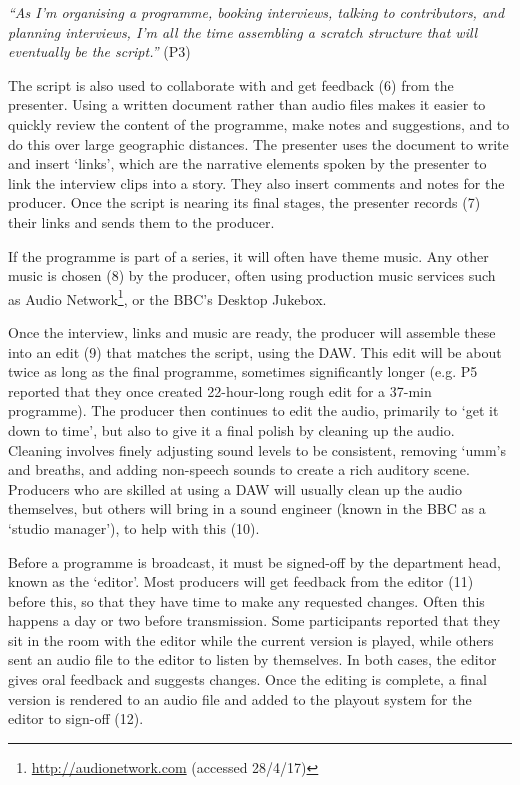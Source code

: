 \textit{``As I'm organising a programme, booking interviews, talking to contributors, and planning interviews, I'm all the time
assembling a scratch structure that will eventually be the script.''} (P3) %

The script is also used to collaborate with and get feedback (6) from the presenter.  Using a written document rather
than audio files makes it easier to quickly review the content of the programme, make notes and suggestions, and to do
this over large geographic distances. The presenter uses the document to write and insert `links', which are the
narrative elements spoken by the presenter to link the interview clips into a story. They also insert comments and
notes for the producer. Once the script is nearing its final stages, the presenter records (7) their links and sends
them to the producer.

If the programme is part of a series, it will often have theme music. Any other music is chosen (8) by the producer,
often using production music services such as Audio Network\footnote{\url{http://audionetwork.com} (accessed 28/4/17)},
or the BBC's Desktop Jukebox.

Once the interview, links and music are ready, the producer will assemble these into an edit (9) that matches the
script, using the DAW. This edit will be about twice as long as the final programme, sometimes significantly longer
(e.g. P5 reported that they once created 22-hour-long rough edit for a 37-min programme). The producer then continues
to edit the audio, primarily to `get it down to time', but also to give it a final polish by cleaning up the audio.
Cleaning involves finely adjusting sound levels to be consistent, removing `umm's and breaths, and adding non-speech
sounds to create a rich auditory scene.  Producers who are skilled at using a DAW will usually clean up the audio
themselves, but others will bring in a sound engineer (known in the BBC as a `studio manager'), to help with this (10).

Before a programme is broadcast, it must be signed-off by the department head, known as the `editor'. Most producers
will get feedback from the editor (11) before this, so that they have time to make any requested changes. Often this
happens a day or two before transmission. Some participants reported that they sit in the room with the editor while
the current version is played, while others sent an audio file to the editor to listen by themselves. In both cases,
the editor gives oral feedback and suggests changes.  Once the editing is complete, a final version is rendered to an
audio file and added to the playout system for the editor to sign-off (12).

